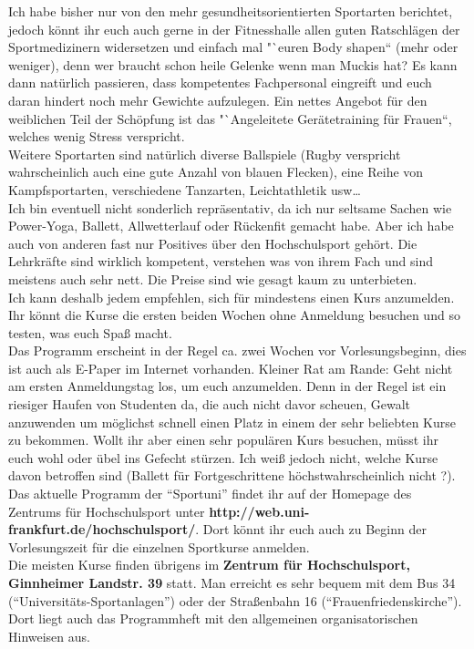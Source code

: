 Ich habe bisher nur von den mehr gesundheitsorientierten Sportarten berichtet, jedoch könnt ihr euch auch gerne in der Fitnesshalle allen guten Ratschlägen der Sportmedizinern widersetzen und einfach mal "`euren Body shapen`` (mehr oder weniger), denn wer braucht schon heile Gelenke wenn man Muckis hat?
Es kann dann natürlich passieren, dass kompetentes Fachpersonal eingreift und euch daran hindert noch mehr Gewichte aufzulegen.
Ein nettes Angebot für den weiblichen Teil der Schöpfung ist das "`Angeleitete Gerätetraining für Frauen``, welches wenig Stress verspricht. \\
Weitere Sportarten sind natürlich diverse Ballspiele (Rugby verspricht wahrscheinlich auch eine gute Anzahl von blauen Flecken), eine Reihe von Kampfsportarten, verschiedene Tanzarten, Leichtathletik usw\ldots \\
Ich bin eventuell nicht sonderlich repräsentativ, da ich nur seltsame Sachen wie Power-Yoga, Ballett, Allwetterlauf oder Rückenfit gemacht habe.
Aber ich habe auch von anderen fast nur Positives über den Hochschulsport gehört.
Die Lehrkräfte sind wirklich kompetent, verstehen was von ihrem Fach und sind meistens auch sehr nett.
Die Preise sind wie gesagt kaum zu unterbieten. \\
Ich kann deshalb jedem empfehlen, sich für mindestens einen Kurs anzumelden.
Ihr könnt die Kurse die ersten beiden Wochen ohne Anmeldung besuchen und so testen, was euch Spaß macht.\\
Das Programm erscheint in der Regel ca. zwei Wochen vor Vorlesungsbeginn, dies ist auch als E-Paper im Internet vorhanden.
Kleiner Rat am Rande: Geht nicht am ersten Anmeldungstag los, um euch anzumelden.
Denn in der Regel ist ein riesiger Haufen von Studenten da, die auch nicht davor scheuen, Gewalt anzuwenden um möglichst schnell einen Platz in einem der sehr beliebten Kurse zu bekommen.
Wollt ihr aber einen sehr populären Kurs besuchen, müsst ihr euch wohl oder übel ins Gefecht stürzen.
Ich weiß jedoch nicht, welche Kurse davon betroffen sind (Ballett für Fortgeschrittene höchstwahrscheinlich nicht ?).\\
Das aktuelle Programm der "`Sportuni"' findet ihr auf der Homepage des Zentrums für Hochschulsport unter \textbf{http://web.uni-frankfurt.de/hochschulsport/}.
Dort könnt ihr euch auch zu Beginn der Vorlesungszeit für die einzelnen Sportkurse anmelden.\\ 
Die meisten Kurse finden übrigens im \textbf{Zentrum für Hochschulsport, Ginnheimer Landstr. 39} statt.
Man erreicht es sehr bequem mit dem Bus 34 ("`Universitäts-Sportanlagen"') oder der Straßenbahn 16 ("`Frauenfriedenskirche"').
Dort liegt auch das Programmheft mit den allgemeinen organisatorischen Hinweisen aus.\\

